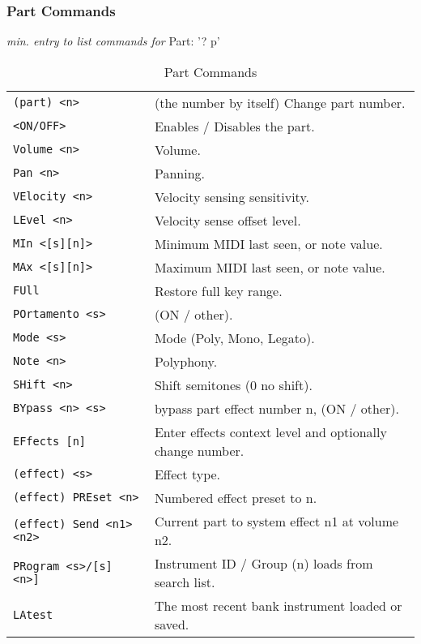 \subsubsection{Part Commands}
\label{subsec:command_line_part_commands}

\textsl{min. entry to list commands for} Part: '? p'

\begin{center}
\begin{longtable}[l]{ ll}
\caption[Part Commands]{Part Commands} \\
   \label{table:yoshimi_part_commands}
\texttt{(part) <n>} &
   (the number by itself) Change part number.  \\
\texttt{<ON/OFF>} &
   Enables / Disables the part. \\
\texttt{Volume <n>} &
   Volume.  \\
\texttt{Pan <n>} &
   Panning.\\
\texttt{VElocity <n>} &
   Velocity sensing sensitivity. \\
\texttt{LEvel <n>} &
   Velocity sense offset level.  \\
\texttt{MIn <[s][n]>} &
   Minimum MIDI last seen, or note value.   \\
\texttt{MAx <[s][n]>} &
   Maximum MIDI last seen, or note value.   \\
\texttt{FUll} &
   Restore full key range.   \\
\texttt{POrtamento <s>} &
   (ON / other).   \\
\texttt{Mode <s>} &
   Mode (Poly, Mono, Legato). \\
\texttt{Note <n>} &
   Polyphony.  \\
\texttt{SHift <n>} &
   Shift semitones (0 no shift). \\
\texttt{BYpass <n> <s>} &
   bypass part effect number n, (ON / other).  \\
\texttt{EFfects [n]} &
   Enter effects context level and optionally change number.  \\
 \texttt{(effect) <s>} &
   Effect type.   \\
 \texttt{(effect) PREset <n>} &
   Numbered effect preset to n. \\
 \texttt{(effect) Send <n1> <n2>} &
   Current part to system effect n1 at volume n2. \\
\texttt{PRogram <s>/[s] <n>]} &
   Instrument ID / Group (n) loads from search list. \\
\texttt{LAtest} &
   The most recent bank instrument loaded or saved. \\

\end{longtable}
\end{center}
